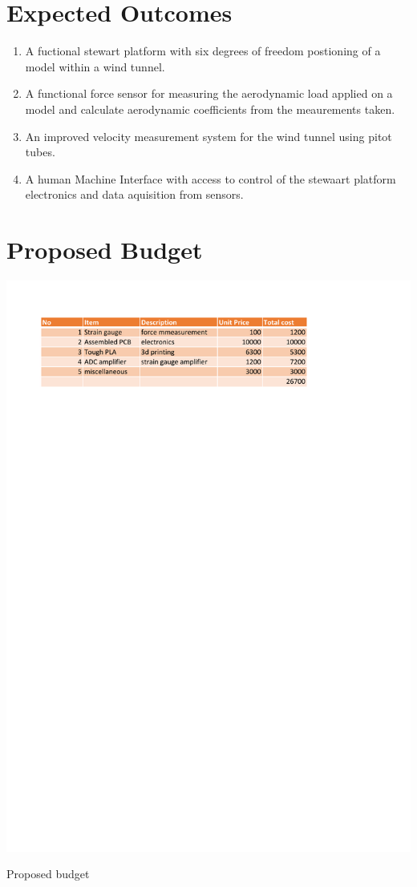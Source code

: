 \section{Expected Outcomes}
\begin{enumerate}
\item A fuctional stewart platform with six degrees of freedom postioning of a model within a wind tunnel.
\item A functional force sensor for measuring the aerodynamic load applied on a model and calculate aerodynamic coefficients from the meaurements taken.
\item An improved velocity measurement system for the wind tunnel using pitot tubes.
\item A human Machine Interface with access to control  of the stewaart platform electronics and data aquisition from sensors.
\end{enumerate}
\newpage
\section{Proposed Budget}
\begin{center}
\begin{table}[!h]
\centering
\includegraphics{Figures/budget}
\caption{Proposed budget}
\end{table}
\end{center}
